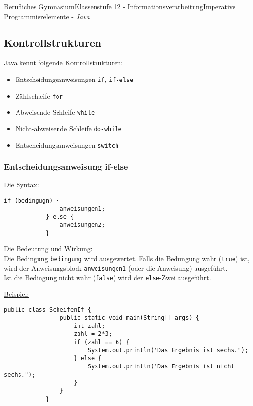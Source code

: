 \documentclass[oneside,openany,headings=optiontotoc,11pt,numbers=noenddot]{article}
\begin{document}
\begin{worksheet}{Berufliches Gymnasium}{Klassenstufe 12 - Informationsverarbeitung}{Imperative Programmierelemente - \textit{Java}}
		\subsection{Kontrollstrukturen}
		Java kennt folgende Kontrollstrukturen:
		\begin{itemize}
			\item Entscheidungsanweisungen {\lstinline[style=JavaInputStyle]|if|}, {\lstinline[style=JavaInputStyle]|if-else|}
			\item Zählschleife {\lstinline[style=JavaInputStyle]|for|}
			\item Abweisende Schleife {\lstinline[style=JavaInputStyle]|while|}
			\item Nicht-abweisende Schleife {\lstinline[style=JavaInputStyle]|do-while|}
			\item Entscheidungsanweisungen {\lstinline[style=JavaInputStyle]|switch|}
		\end{itemize}
		\subsubsection{Entscheidungsanweisung if-else}
		\underline{Die Syntax:}
		\begin{lstlisting}[style=JavaInputStyle]
			if (bedingugn) {
				anweisungen1;
			} else {
				anweisungen2;
			}
		\end{lstlisting}
		\underline{Die Bedeutung und Wirkung:}\\
		Die Bedingung \lstinline[style=JavaInputStyle]|bedingung| wird ausgewertet. Falls die Bedungung wahr (\lstinline[style=JavaInputStyle]|true|) ist, wird der Anweisungsblock \lstinline[style=JavaInputStyle]|anweisungen1| (oder die Anweisung) ausgeführt.\\
		Ist die Bedingung nicht wahr (\lstinline[style=JavaInputStyle]|false|) wird der \lstinline[style=JavaInputStyle]|else|-Zwei ausgeführt.\\
		\par\noindent
		\underline{Beispiel:}
		\begin{lstlisting}[style=JavaInputStyle]
			public class ScheifenIf {
				public static void main(String[] args) {
					int zahl;
					zahl = 2*3;
					if (zahl == 6) {
						System.out.println("Das Ergebnis ist sechs.");
					} else {
						System.out.println("Das Ergebnis ist nicht sechs.");
					}
				}
			}
		\end{lstlisting}

\end{worksheet}
\end{document}
